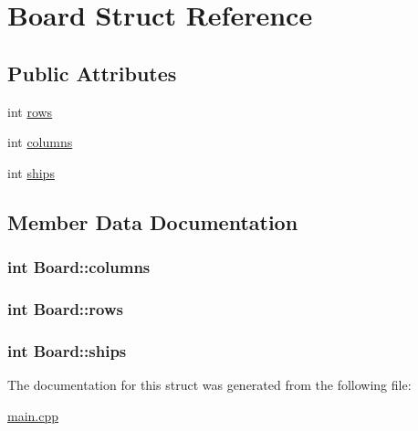 \hypertarget{struct_board}{\section{Board Struct Reference}
\label{struct_board}
}
\subsection*{Public Attributes}
\begin{DoxyCompactItemize}
\item 
int \hyperlink{struct_board_ab0678710e0cb026be902dbb6a8ad8c40}{rows}
\item 
int \hyperlink{struct_board_abd6db5048c565a2236812ae739f12638}{columns}
\item 
int \hyperlink{struct_board_a8516818f13e7662c7cbda336307cf38e}{ships}
\end{DoxyCompactItemize}


\subsection{Member Data Documentation}
\hypertarget{struct_board_abd6db5048c565a2236812ae739f12638}{
\subsubsection[{columns}]{\setlength{\rightskip}{0pt plus 5cm}int Board\+::columns}}\label{struct_board_abd6db5048c565a2236812ae739f12638}
\hypertarget{struct_board_ab0678710e0cb026be902dbb6a8ad8c40}{
\subsubsection[{rows}]{\setlength{\rightskip}{0pt plus 5cm}int Board\+::rows}}\label{struct_board_ab0678710e0cb026be902dbb6a8ad8c40}
\hypertarget{struct_board_a8516818f13e7662c7cbda336307cf38e}{
\subsubsection[{ships}]{\setlength{\rightskip}{0pt plus 5cm}int Board\+::ships}}\label{struct_board_a8516818f13e7662c7cbda336307cf38e}


The documentation for this struct was generated from the following file\+:\begin{DoxyCompactItemize}
\item 
\hyperlink{main_8cpp}{main.\+cpp}\end{DoxyCompactItemize}
